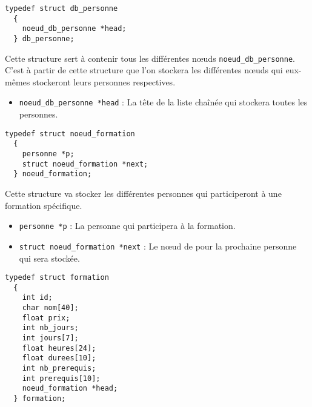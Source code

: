 \documentclass[11pt]{article}
\begin{document}
\begin{lstlisting}[firstnumber=63]
  typedef struct db_personne
  {
    noeud_db_personne *head;
  } db_personne;
\end{lstlisting}

Cette structure sert à contenir tous les différentes n\oe{}uds \texttt{noeud\_db\_personne}. C'est à partir de cette structure que l'on stockera les différentes n\oe{}uds qui eux-mêmes stockeront leurs personnes respectives.
\begin{itemize}
\item \texttt{noeud\_db\_personne *head} : La tête de la liste chaînée qui stockera toutes les personnes.
\end{itemize}

\begin{lstlisting}[firstnumber=73]
  typedef struct noeud_formation
  {
    personne *p;
    struct noeud_formation *next;
  } noeud_formation;
\end{lstlisting}

Cette structure va stocker les différentes personnes qui participeront à une formation spécifique.
\begin{itemize}
\item \texttt{personne *p} : La personne qui participera à la formation.
\item \texttt{struct noeud\_formation *next} : Le n\oe{}ud de pour la prochaine personne qui sera stockée.
\end{itemize}

\begin{lstlisting}[firstnumber=94]
  typedef struct formation
  {
    int id;
    char nom[40];
    float prix;
    int nb_jours;
    int jours[7];
    float heures[24];
    float durees[10];
    int nb_prerequis;
    int prerequis[10];
    noeud_formation *head;
  } formation;
\end{lstlisting}
\end{document}
